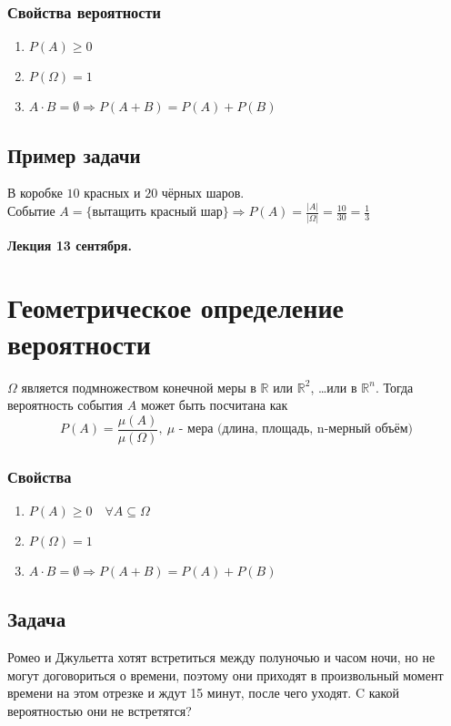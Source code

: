 \documentclass[12pt, a4paper]{article}
\begin{document}
    \subsubsection*{Свойства вероятности}
    \begin{enumerate}
        \item $P(A) \geq 0$
        \item $P(\Omega) = 1$
        \item $A\cdot B = \emptyset\Rightarrow P(A + B) = P(A) + P(B)$
    \end{enumerate}
    \subsection*{Пример задачи}
    В коробке $10$ красных и $20$ чёрных шаров.\\
    Событие $A = \{\text{вытащить красный шар}\}\Rightarrow P(A) = \frac{|A|}{|\Omega|} = \frac{10}{30} = \frac{1}{3}$
    \begin{center}
        \bf Лекция 13 сентября.
    \end{center}
    \section*{Геометрическое определение вероятности}
    $\Omega$ является подмножеством конечной меры в $\mathbb{R}$ или $\mathbb{R}^2$, \dots или в $\mathbb{R}^n$. Тогда вероятность события $A$ может быть посчитана как
    \[P(A) = \frac{\mu(A)}{\mu(\Omega)},\ \text{$\mu$ - мера (длина, площадь, n-мерный объём)}\]
    \subsubsection*{Свойства}
    \begin{enumerate}
        \item $P(A) \geq 0\quad \forall A\subseteq \Omega$
        \item $P(\Omega) = 1$
        \item $A\cdot B = \emptyset\Rightarrow P(A + B) = P(A) + P(B)$
    \end{enumerate}
    \subsection*{Задача}
    Ромео и Джульетта хотят встретиться между полуночью и часом ночи, но не могут договориться о времени, поэтому они приходят в произвольный момент времени на этом отрезке и ждут 15 минут, после чего уходят. C какой вероятностью они не встретятся?
\end{document}
